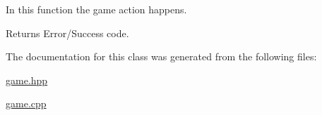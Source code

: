 In this function the game action happens. 

\begin{DoxyReturn}{Returns}
Error/\-Success code. 
\end{DoxyReturn}


The documentation for this class was generated from the following files\-:\begin{DoxyCompactItemize}
\item 
\hyperlink{game_8hpp}{game.\-hpp}\item 
\hyperlink{game_8cpp}{game.\-cpp}\end{DoxyCompactItemize}
